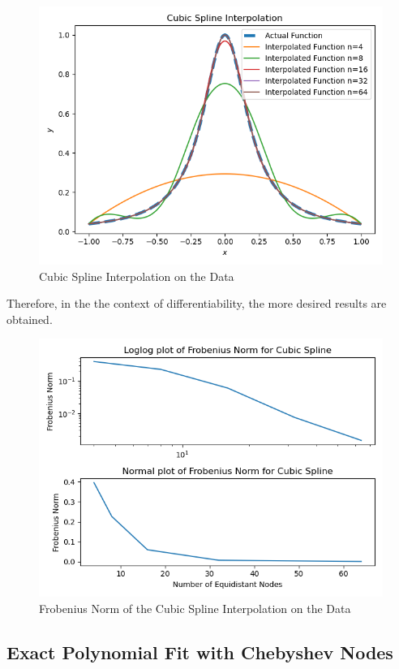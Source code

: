 \documentclass[letterpaper,12pt]{article}
\begin{document}
\begin{figure}[H]
    \centerline{\includegraphics[width=\linewidth]{figures/cubspline.png}}
    \caption{Cubic Spline Interpolation on the Data}
    \label{fig:cubspline}
    \end{figure}
Therefore, in the the context of differentiability, the more desired results are obtained.
\begin{figure}[H]
    \centerline{\includegraphics[width=\linewidth]{figures/frobcubspline.png}}
    \caption{Frobenius Norm of the Cubic Spline Interpolation on the Data}
    \label{fig:frobcubspline}
    \end{figure}

\subsection{Exact Polynomial Fit with Chebyshev Nodes}
\end{document}

